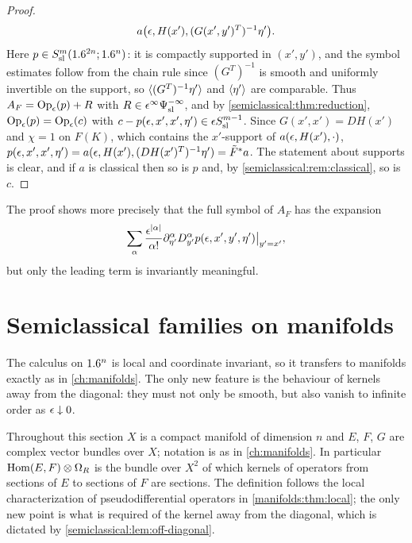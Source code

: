 \begin{proof}
\begin{equation*}
    a\bigl(\epsilon,H(x'),(G(x',y')^T)^{-1}\eta'\bigr).
  \end{equation*}
  Here $p\in S^{m}_{\mathrm{sl}}(1.6^{2n};1.6^n)$: it is compactly supported in $(x',y')$, and the
  symbol estimates follow from the chain rule since $(G^T)^{-1}$ is smooth and
  uniformly invertible on the support, so $\langle (G^T)^{-1}\eta'\rangle$ and $\langle \eta'\rangle$ are
  comparable. Thus $A_F=\operatorname{Op}_\epsilon(p)+R$ with $R\in\epsilon^\infty\Psi^{-\infty}_{\mathrm{sl}}$, and by
  \cref{semiclassical:thm:reduction}, $\operatorname{Op}_\epsilon(p)=\operatorname{Op}_\epsilon(c)$ with
  $c-p(\epsilon,x',x',\eta')\in\epsilon S^{m-1}_{\mathrm{sl}}$. Since $G(x',x')=DH(x')$ and $\chi=1$
  on $F(K)$, which contains the $x'$-support of $a(\epsilon,H(x'),\cdot)$,
  $p(\epsilon,x',x',\eta')=a(\epsilon,H(x'),(DH(x')^T)^{-1}\eta')=\tilde F^*a$. The
  statement about supports is clear, and if $a$ is classical then so is $p$ and,
  by \cref{semiclassical:rem:classical}, so is $c$.
\end{proof}

The proof shows more precisely that the full symbol of $A_F$ has the expansion
\begin{equation*}
  \sum_\alpha\frac{\epsilon^{\lvert \alpha\rvert}}{\alpha!}\partial^\alpha_{\eta'}D^\alpha_{y'}p(\epsilon,x',y',\eta')\big|_{y'=x'},
\end{equation*}
but only the leading term is invariantly meaningful.

\section{Semiclassical families on manifolds}\label{semiclassical:sec:manifolds}

The calculus on $1.6^n$ is local and coordinate invariant, so it transfers to
manifolds exactly as in \cref{ch:manifolds}. The only new feature is the
behaviour of kernels away from the diagonal: they must not only be smooth, but
also vanish to infinite order as $\epsilon\downarrow0$.

Throughout this section $X$ is a compact manifold of dimension $n$ and $E$, $F$,
$G$ are complex vector bundles over $X$; notation is as in \cref{ch:manifolds}.
In particular $\operatorname{Hom}(E,F)\otimes\Omega_R$ is the bundle over $X^2$ of which
kernels of operators from sections of $E$ to sections of $F$ are sections. The
definition follows the local characterization of pseudodifferential operators in
\cref{manifolds:thm:local}; the only new point is what is required of the kernel
away from the diagonal, which is dictated by \cref{semiclassical:lem:off-diagonal}.


